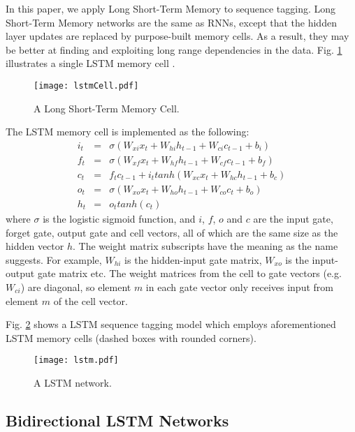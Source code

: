 \documentclass[11pt,a4paper]{article}
\begin{document}
In this paper, we apply Long Short-Term Memory \cite{hochreiter1,graves1} to sequence tagging. Long Short-Term Memory networks are the same as RNNs, except that the hidden layer updates are replaced by purpose-built memory cells. As a result, they may be better at finding and exploiting long range dependencies in the data. Fig. \ref{fig:lstmCell} illustrates a single LSTM memory cell \cite{graves1}. 
\begin{figure}[htb]
	\centering
		\texttt{[image: lstmCell.pdf]}
	\caption{A Long Short-Term Memory Cell.}
	\label{fig:lstmCell}
\end{figure} 
The LSTM memory cell is implemented as the following:
\begin{eqnarray*}
i_t &=& \sigma (W_{xi} x_t + W_{hi} h_{t-1} + W_{ci} c_{t-1} + b_i) \\
f_t &=& \sigma (W_{xf} x_t + W_{hf} h_{t-1} + W_{cf} c_{t-1} + b_f) \\
c_t &= &f_t c_{t-1} + i_t tanh (W_{xc} x_t + W_{hc} h_{t-1} + b_c) \\
o_t &=& \sigma (W_{xo} x_t + W_{ho} h_{t-1} + W_{co} c_t + b_o) \\
h_t &=& o_t tanh (c_t)
\end{eqnarray*}
where $\sigma$ is the logistic sigmoid function, and $i$, $f$, $o$ and $c$ are the input gate, forget gate, output gate and cell vectors, all of which are the same size as the hidden vector $h$. The weight matrix subscripts have the meaning as the name suggests. For example, $W_{hi}$ is the hidden-input gate matrix, $W_{xo}$ is the input-output gate matrix etc. The weight matrices from the cell to gate vectors (e.g. $W_{ci}$) are diagonal, so element $m$ in each gate vector only receives input from element $m$ of the cell vector. 

Fig. \ref{fig:lstm} shows a LSTM sequence tagging model which employs aforementioned LSTM memory cells (dashed boxes with rounded  corners). 
\begin{figure}[!htb]
	\centering
		\texttt{[image: lstm.pdf]}
	\caption{A LSTM network.}
	\label{fig:lstm}
\end{figure} 

\subsection{Bidirectional LSTM Networks}
\end{document}
